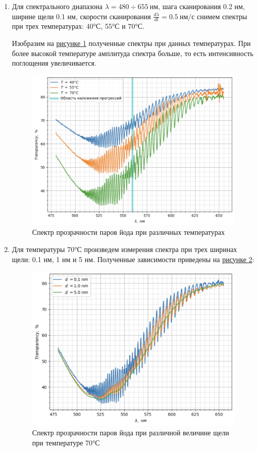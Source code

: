 \documentclass{article}
\begin{document}
\begin{enumerate}
    \item Для спектрального диапазона $\lambda = 480 \div 655~нм$, шага сканирования 0.2 нм, ширине щели 0.1 нм, скорости сканирования $\frac{d\lambda}{dt} = 0.5~нм/с$ снимем спектры при трех температурах: 40°С, 55°С и 70°С. 
    
    Изобразим на \hyperref[fig:I2(40)]{рисунке \ref*{fig:I2(40,50,70)}} полученные спектры при данных температурах. При более высокой температуре амплитуда спектра больше, то есть интенсивность поглощения увеличивается.
\begin{figure}[h!]
    \centering
    \includegraphics[scale = 0.55]{i2_405570.png}
    \caption{Спектр прозрачности паров йода при различных температурах}
    \label{fig:I2(40,50,70)}
\end{figure}
\newpage
\item Для температуры 70°С произведем измерения спектра при трех ширинах щели: 0.1 нм, 1 нм и 5 нм. Полученные зависимости приведены на \hyperref[fig:I2(70)]{рисунке \ref*{fig:I2(70)}}: 
\begin{figure}[h!]
    \centering
    \includegraphics[scale = 0.55]{щель_new.png}
    \caption{Спектр прозрачности паров йода при различной величине щели при температуре 70°С}
    \label{fig:I2(70)}
\end{figure}


\end{enumerate}
\end{document}
